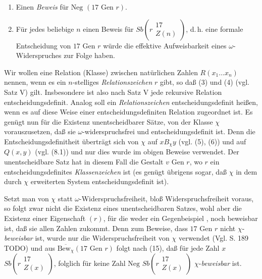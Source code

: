 \documentclass[draft]{scrartcl}
\begin{document}
\begin{enumerate}
	\item Einen \textit{Beweis} für $\text{Neg }\left(17 \text{ Gen } r\right)$.
	\item Für jedes beliebige $n$ einen Beweis für $Sb\left(r\substack{17\\ Z\left(n\right)}\right)$, d.\,h. eine formale Entscheidung von $17\text{ Gen } r$ würde die effektive Aufweisbarkeit eines $\omega$-Widerspruches zur Folge haben.
\end{enumerate}

Wir wollen eine Relation (Klasse) zwischen natürlichen Zahlen $R\left(x_1 \dots x_n\right)$ 
 nennen, wenn es ein $n$-stelliges \textit{Relationszeichen} $r$ gibt, 
so daß (3) und (4) (vgl. Satz V) gilt.
Insbesondere ist also nach Satz V jede rekursive Relation
entscheidungsdefinit. Analog soll ein \textit{Relationszeichen} entscheidungsdefinit
 heißen, wenn es auf diese Weise einer entscheidungsdefiniten Relation zugeordnet ist. 
Es genügt nun für die Existenz unentscheidbarer Sätze, von der Klasse $\chi$ vorauszusetzen, 
daß sie $\omega$-widerspruchsfrei und entscheidungsdefinit ist. Denn die 
Entscheidungsdefinitheit überträgt sich von $\chi$ auf $x B_\chi y$ (vgl. (5), (6)) und 
auf $Q\left(x, y\right)$ (vgl. (8.1)) und nur dies wurde im obigen Beweise verwendet.
Der unentscheidbare Satz hat in diesem Fall die Gestalt $v\text{ Gen } r$, wo $r$ ein 
entscheidungsdefinites \textit{Klassenzeichen} ist (es genügt übrigens sogar, 
daß $\chi$ in dem durch $\chi$ erweiterten System entscheidungsdefinit ist).

Setzt man von $\chi$ statt $\omega$-Widerspruchsfreiheit, bloß 
Widerspruchsfreiheit voraus, so folgt zwar nicht die Existenz
 eines unentscheidbaren Satzes, wohl aber die Existenz einer 
Eigenschaft $\left(r\right)$, für die weder ein Gegenbeispiel 
, noch beweisbar ist, daß sie allen Zahlen zukommt. 
Denn zum Beweise, dass $17\text{ Gen } r$ nicht 
$\chi$-\textit{beweisbar} ist, wurde nur die Widerspruchsfreiheit 
von $\chi$ verwendet (Vgl. S. 189 TODO) und aus
 $\overline{\text{Bew}_\chi}\left(17\text{ Gen } r\right)$ folgt
nach (15), daß für jede Zahl $x$ 
$Sb\left(r\substack{17\\ Z\left(x\right)}\right)$, folglich für
 keine Zahl $\text{Neg }Sb\left(r\substack{17\\ Z\left(x\right)}\right)$ $\chi$-\textit{beweisbar} ist.
\end{document}

